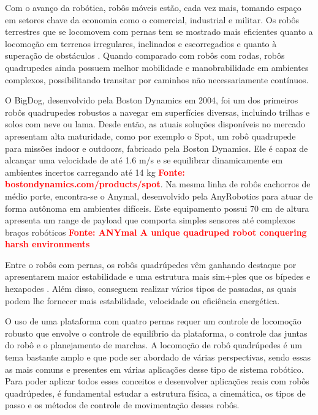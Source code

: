 \documentclass[../main.tex]{subfiles}
\begin{document}
  Com o avanço da robótica, robôs móveis estão, cada vez mais, tomando espaço em setores chave da economia como o comercial, industrial e militar. Os robôs terrestres que se locomovem com pernas tem se mostrado mais eficientes quanto a locomoção em terrenos irregulares, inclinados e escorregadios e quanto à superação de obstáculos \cite{X.134}. Quando comparado com robôs com rodas, robôs quadrupedes ainda possuem melhor mobilidade e manobrabilidade em ambientes complexos, possibilitando transitar por caminhos não necessariamente contínuos.
          
  O BigDog, desenvolvido pela Boston Dynamics em 2004, foi um dos primeiros robôs quadrupedes  robustos a navegar em superfícies diversas, incluindo trilhas e solos com neve ou lama. Desde então, as atuais soluções disponíveis no mercado apresentam alta maturidade, como por exemplo o Spot, um robô quadrupede para missões indoor e outdoors, fabricado pela Boston Dynamics. Ele é capaz de alcançar uma velocidade de até 1.6 m/s e se equilibrar dinamicamente em ambientes incertos carregando até 14 kg \textbf{\textcolor{red}{Fonte: bostondynamics.com/products/spot}}.  Na mesma linha de robôs cachorros de médio porte, encontra-se o Anymal, desenvolvido pela AnyRobotics para atuar de forma autônoma em ambientes difíceis. Este equipamento possui 70 cm de altura apresenta um range de payload que comporta simples sensores até complexos braços robóticos \textbf{\textcolor{red}{Fonte: ANYmal A unique quadruped robot conquering harsh environments}}

  Entre o robôs com pernas, os robôs quadrúpedes vêm ganhando destaque por apresentarem maior estabilidade e uma estrutura mais sim+ples que os bípedes e hexapodes \cite{Shi2021}. Além disso, conseguem realizar vários tipos de passadas, as quais podem lhe fornecer mais estabilidade, velocidade ou eficiência energética. 

  O uso de uma plataforma com quatro pernas requer um controle de locomoção robusto que envolve o controle de equilíbrio da plataforma, o controle das juntas do robô e o planejamento de marchas. A locomoção de robô quadrúpedes é um tema bastante amplo e que pode ser abordado de várias perspectivas, sendo essas as mais comuns e presentes em várias aplicações desse tipo de sistema robótico. Para poder aplicar todos esses conceitos e desenvolver aplicações reais com robôs quadrúpedes, é fundamental estudar a estrutura física, a cinemática, os tipos de passo e os métodos de controle de movimentação desses robôs. 
\end{document}
